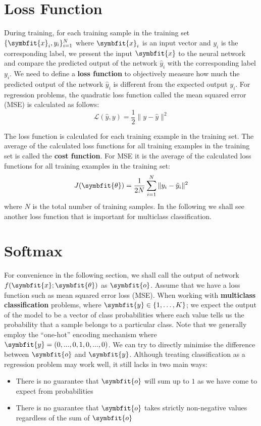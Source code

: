 \section{Loss Function}\label{sec:loss-fn}
During training, for each training sample in the training set $\{\symbfit{x}_i, y_i\}_{i=1}^N$ where $\symbfit{x}_i$ is an input vector and $y_i$ is the corresponding label, we present the input $\symbfit{x}$ to the neural network and compare the predicted output of the network $\hat{y}_i$ with the corresponding label $y_i$.
We need to define a \textbf{loss function} to objectively measure how much the predicted output of the network $\hat{y}_i$ is different from the expected output $y_i$. For regression problems, the quadratic loss function called the mean squared error (MSE) is calculated as follows:
\begin{equation}
    \mathcal{L}({\hat{y}}, {y}) = \frac{1}{2} \| {y} - {\hat{y}} \| ^ 2
\end{equation}

The loss function is calculated for each training example in the training set. The average of the calculated loss functions for all training examples in the training set is called the \textbf{cost function}. For MSE it is the average of the calculated loss functions for all training examples in the training set:
\begin{equation}
    J(\symbfit{\theta}) = \frac{1}{2N} \sum_{i=1}^{N} \| {y}_i - {\hat{y}_i} \| ^ 2
\end{equation}
where $N$ is the total number of training samples. In the following  we shall see another loss function that is important for multiclass classification.

\section{Softmax} \label{sec:softmax}
For convenience in the following section, we shall call the output of network $f(\symbfit{x}; \symbfit{\theta})$ as $\symbfit{o}$. Assume that we have a loss function such as mean squared error loss (MSE). When working with \textbf{multiclass classification} problems, where \(\symbfit{y} \in \left\{1,\ldots, K \right\}\); we expect the output of the model to be a vector of class probabilities where each value tells us the probability that a sample belongs to a particular class.
Note that we generally employ the ``one-hot'' encoding mechanism where $\symbfit{y} = (0, ... , 0, 1, 0, ... , 0)$.
We can try to directly minimise the difference between $\symbfit{o}$ and $\symbfit{y}$. Although treating classification as a regression problem may work well, it still lacks in two main ways:
\begin{itemize}
    \item There is no guarantee that $\symbfit{o}$ will sum up to $1$ as we have come to expect from probabilities
    \item There is no guarantee that $\symbfit{o}$ takes strictly non-negative values regardless of the sum of $\symbfit{o}$
\end{itemize}

